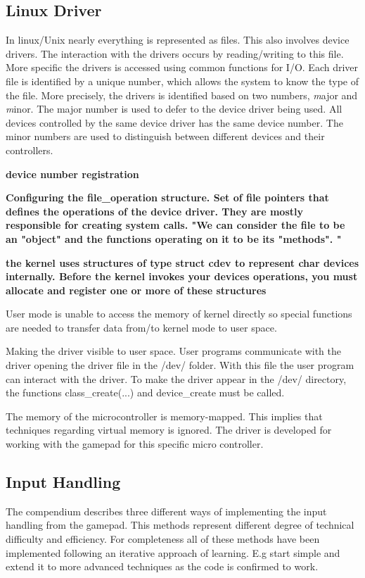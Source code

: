 \subsection{Linux Driver}
In linux/Unix nearly everything is represented as files. This also involves device drivers. The interaction with the drivers occurs by reading/writing to this file. More specific the drivers is accessed  using common functions for I/O. Each driver file is identified by a unique number, which allows the system to know the type of the file. More precisely, the drivers is identified based on two numbers, \emph major and \emph minor. The major number is used to defer to the device driver being used. All devices controlled by the same device driver has the same device number. The minor numbers are used to distinguish between different devices and their controllers. 



{\bf device number registration}


{\bf Configuring the file\_operation structure. Set of file pointers that defines the operations of the device driver. They are mostly responsible for creating system calls. "We can consider the file to be an "object" and the functions operating on it to be its "methods". "}



{\bf the kernel uses structures of type struct cdev to represent char devices internally. Before the kernel invokes your devices operations, you must allocate and register one or more of these structures}


User mode is unable to access the memory of kernel directly so special functions are needed to transfer data from/to kernel mode to user space.





Making the driver visible to user space. User programs communicate with the driver opening the driver file in the /dev/ folder. With this file the user program can interact with the driver. To make the driver appear in the /dev/ directory, the functions class\_create(...) and device\_create must be called. 


The memory of the microcontroller is memory-mapped. This implies that techniques regarding virtual memory is ignored. The driver is developed for working with the gamepad for this specific micro controller. 

\subsection{Input Handling}
The compendium describes three different ways of implementing the input handling from the gamepad. This methods represent different degree of technical difficulty and efficiency. For completeness all of these methods have been implemented following an iterative approach of learning. E.g start simple and extend it to more advanced techniques as the code is confirmed to work. 

